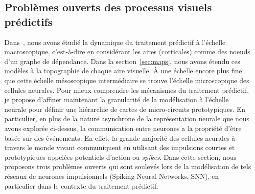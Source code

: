%

\subsection{Problèmes ouverts des processus visuels prédictifs}
\label{sec:spikes}
Dans~\citep{PerrinetAdamsFriston14}, nous avons étudié la dynamique du traitement prédictif à
l'échelle macroscopique, c'est-à-dire en considérant les aires
(corticales) comme des noeuds d'un graphe de dépendance. Dans la section~\ref{sec:maps},
nous avons étendu ces modèles à la topographie de chaque aire visuelle. À une échelle
encore plus fine que cette échelle mésoscopique intermédiaire se trouve
l'échelle microscopique des cellules neurales. Pour mieux
comprendre les mécanismes du traitement prédictif, je propose d'affiner
maintenant la granularité de la modélisation à l'échelle neurale
pour définir une hiérarchie de cartes de micro-circuits prototypiques. En
particulier, en plus de la nature asynchrone de la représentation
neurale que nous avons explorée ci-dessus, la communication entre
neurones a la propriété d'être basée sur des événements. En effet, la
grande majorité des cellules neurales à travers le monde vivant
communiquent en utilisant des impulsions courtes et prototypiques
appelées potentiels d'action ou \emph{spikes}. Dans cette section, nous
proposons trois problèmes ouverts qui sont soulevés lors de la
modélisation de tels réseaux de neurones impulsionnels (Spiking Neural Networks, SNN), en particulier dans le contexte du traitement prédictif.

